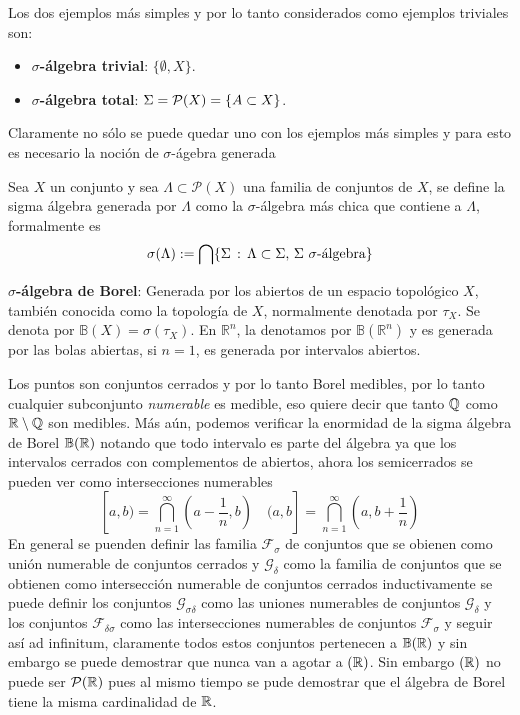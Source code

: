 \documentclass[main.tex]{subfiles}
\begin{document}
\eje Los dos ejemplos más simples y por lo tanto considerados como ejemplos triviales son:
\begin{itemize}
    \item \textbf{$\sigma$-álgebra trivial}: $\{\emptyset, X\}$.
    \item \textbf{$\sigma$-álgebra total}: $\Sigma=\mathcal{P}(X)=\{A\subset X\}$.
\end{itemize}

Claramente no sólo se puede quedar uno con los ejemplos más simples y para esto es necesario la noción de $\sigma$-ágebra generada
\begin{def.}
  Sea $X$ un conjunto y sea $\Lambda\subset\mathcal{P}(X)$ una familia de conjuntos de $X$, se define la sigma álgebra generada por $\Lambda$ como la $\sigma$-álgebra más chica que contiene a $\Lambda$, formalmente es
  \[
  \sigma(\Lambda):=\bigcap\{\Sigma\,:\,\Lambda\subset\Sigma,\,\Sigma\,\,\sigma\text{-álgebra}\}
  \]
\end{def.}
\eje \textbf{$\sigma$-álgebra de Borel}: Generada por los abiertos de un espacio topológico $X$, también conocida como la topología de $X$, normalmente denotada por $\tau_X$. Se denota por $\mathbb{B}(X)=\sigma(\tau_X)$. En $\mathbb{R}^n$, la denotamos por $\mathbb{B}(\mathbb{R}^n)$ y es generada por las bolas abiertas, si $n=1$, es generada por intervalos abiertos.

\obs Los puntos son conjuntos cerrados y por lo tanto Borel medibles, por lo tanto cualquier subconjunto \emph{numerable} es medible, eso quiere decir que tanto $ \mathbb Q $ como $\mathbb R \setminus \mathbb Q $ son medibles. Más aún, podemos verificar la enormidad de la sigma álgebra de Borel $\mathbb{B}(\mathbb R )$ notando que todo intervalo es parte del álgebra ya que los intervalos cerrados con complementos de abiertos, ahora los semicerrados se pueden ver como intersecciones numerables
\[
[a,b)=\bigcap_{n=1}^{\infty}(a-\frac{1}{n},b)\quad(a,b]=\bigcap_{n=1}^{\infty}(a,b+\frac{1}{n})
\]
En general se puenden definir las familia $\mathcal{F}_{\sigma}$ de conjuntos que se obienen como unión numerable de conjuntos cerrados y $\mathcal{G}_{\delta}$ como la familia de conjuntos que se obtienen como intersección numerable de conjuntos cerrados inductivamente se puede definir los conjuntos $\mathcal{G}_{\sigma\delta}$ como las uniones numerables de conjuntos $\mathcal{G}_{\delta}$ y los conjuntos $\mathcal{F}_{\delta\sigma}$ como las intersecciones numerables de conjuntos $\mathcal{F}_{\sigma}$ y seguir así ad infinitum, claramente todos estos conjuntos pertenecen a $\mathbb{B}(\mathbb R )$ y sin embargo se puede demostrar que nunca van a agotar a $\mathbb(\mathbb R )$. Sin embargo $\mathbb(\mathbb R )$ no puede ser $\mathcal{P}(\mathbb R )$ pues al mismo tiempo se pude demostrar que el álgebra de Borel tiene la misma cardinalidad de $\mathbb R $.
\end{document}
